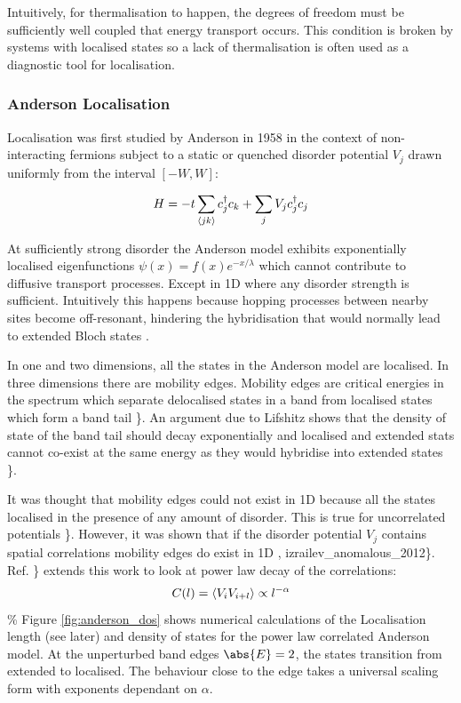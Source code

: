 Intuitively, for thermalisation to happen, the degrees of freedom must be sufficiently well coupled that energy transport occurs. This condition is broken by systems with localised states so a lack of thermalisation is often used as a diagnostic tool for localisation.

\hypertarget{anderson-localisation}{%
\subsubsection{Anderson Localisation}\label{anderson-localisation}}

Localisation was first studied by Anderson in 1958 \textcite{anderson_absence_1958-1} in the context of non-interacting fermions subject to a static or quenched disorder potential \(V_j\) drawn uniformly from the interval \([-W,W]\):

\[
H = -t\sum_{\langle jk \rangle} c^\dagger_j c_k + \sum_j V_j c_j^\dagger c_j
\]

At sufficiently strong disorder the Anderson model exhibits exponentially localised eigenfunctions \(\psi(x) = f(x) e^{-x/\lambda}\) which cannot contribute to diffusive transport processes. Except in 1D where any disorder strength is sufficient. Intuitively this happens because hopping processes between nearby sites become off-resonant, hindering the hybridisation that would normally lead to extended Bloch states \textcite{kramer_localization_1993}.

In one and two dimensions, all the states in the Anderson model are localised. In three dimensions there are mobility edges. Mobility edges are critical energies in the spectrum which separate delocalised states in a band from localised states which form a band tail \textcite{abanin_recent_2017}\}. An argument due to Lifshitz shows that the density of state of the band tail should decay exponentially and localised and extended stats cannot co-exist at the same energy as they would hybridise into extended states \textcite{kramer_localization_1993}\}.

It was thought that mobility edges could not exist in 1D because all the states localised in the presence of any amount of disorder. This is true for uncorrelated potentials \textcite{goldshtein_pure_1977}\}. However, it was shown that if the disorder potential \(V_j\) contains spatial correlations mobility edges do exist in 1D \textcite{izrailev_localization_1999}, izrailev\_anomalous\_2012\}. Ref. \textcite{croy_anderson_2011}\} extends this work to look at power law decay of the correlations: \[ C(l) = \langle V_i V_{i+l} \rangle \propto l^{-\alpha} \] \% Figure \ref{fig:anderson_dos} shows numerical calculations of the Localisation length (see later) and density of states for the power law correlated Anderson model. At the unperturbed band edges \(\abs{E} = 2\), the states transition from extended to localised. The behaviour close to the edge takes a universal scaling form with exponents dependant on \(\alpha\).


